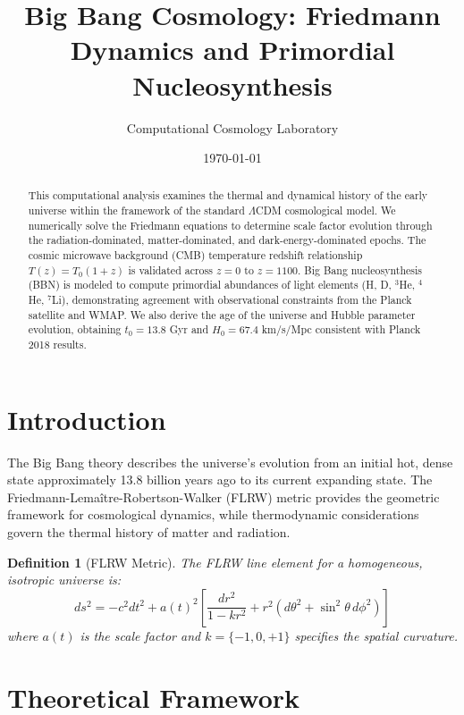 \documentclass[a4paper, 11pt]{article}
\title{Big Bang Cosmology: Friedmann Dynamics and Primordial Nucleosynthesis}
\author{Computational Cosmology Laboratory}
\date{\today}
\newtheorem{definition}{Definition}[section]
\begin{document}
\maketitle

\begin{abstract}
This computational analysis examines the thermal and dynamical history of the early universe
within the framework of the standard $\Lambda$CDM cosmological model. We numerically solve the
Friedmann equations to determine scale factor evolution through the radiation-dominated,
matter-dominated, and dark-energy-dominated epochs. The cosmic microwave background (CMB)
temperature redshift relationship $T(z) = T_0(1+z)$ is validated across $z = 0$ to $z = 1100$.
Big Bang nucleosynthesis (BBN) is modeled to compute primordial abundances of light elements
(H, D, $^3$He, $^4$He, $^7$Li), demonstrating agreement with observational constraints from
the Planck satellite and WMAP. We also derive the age of the universe and Hubble parameter
evolution, obtaining $t_0 = 13.8$ Gyr and $H_0 = 67.4$ km/s/Mpc consistent with Planck 2018 results.
\end{abstract}

\section{Introduction}

The Big Bang theory describes the universe's evolution from an initial hot, dense state approximately
13.8 billion years ago to its current expanding state. The Friedmann-Lemaître-Robertson-Walker (FLRW)
metric provides the geometric framework for cosmological dynamics, while thermodynamic considerations
govern the thermal history of matter and radiation.

\begin{definition}[FLRW Metric]
The FLRW line element for a homogeneous, isotropic universe is:
\begin{equation}
ds^2 = -c^2 dt^2 + a(t)^2 \left[ \frac{dr^2}{1-kr^2} + r^2(d\theta^2 + \sin^2\theta \, d\phi^2) \right]
\end{equation}
where $a(t)$ is the scale factor and $k = \{-1, 0, +1\}$ specifies the spatial curvature.
\end{definition}

\section{Theoretical Framework}
\end{document}
